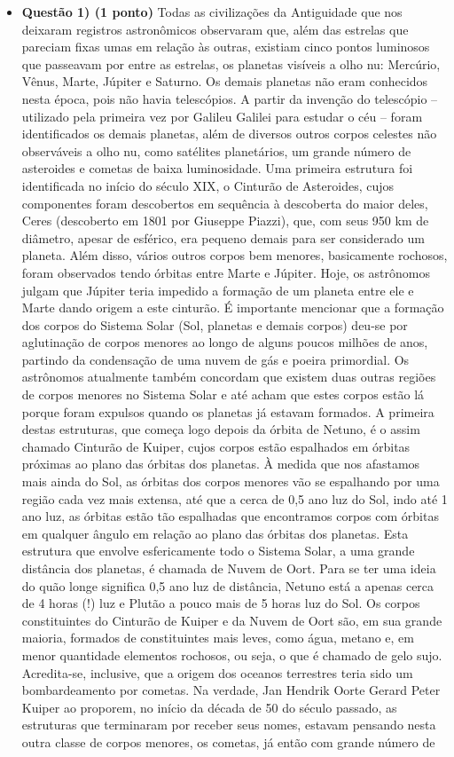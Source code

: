 \documentclass[a4paper, 12pt]{article}
\begin{document}
    \begin{flushleft} \begin{itemize}
        \item \textbf{Questão 1) (1 ponto)} Todas as civilizações da Antiguidade que nos deixaram registros astronômicos observaram que, além das estrelas que pareciam fixas umas em relação às outras, existiam cinco pontos luminosos que passeavam por entre as estrelas, os planetas visíveis a olho nu: Mercúrio, Vênus, Marte, Júpiter e Saturno. Os demais planetas não eram conhecidos nesta época, pois não havia telescópios. A partir da invenção do telescópio – utilizado pela primeira vez por Galileu Galilei para estudar o céu – foram identificados os demais planetas, além de diversos outros corpos celestes não observáveis a olho nu, como satélites planetários, um grande número de asteroides e cometas de baixa luminosidade. Uma primeira estrutura foi identificada no início do século XIX, o Cinturão de Asteroides, cujos componentes foram descobertos em sequência à descoberta do maior deles, Ceres (descoberto em 1801 por Giuseppe Piazzi), que, com seus 950 km de diâmetro, apesar de esférico, era pequeno demais para ser considerado um planeta. Além disso, vários outros corpos bem menores, basicamente rochosos, foram observados tendo órbitas entre Marte e Júpiter. Hoje, os astrônomos julgam que Júpiter teria impedido a formação de um planeta entre ele e Marte dando origem a este cinturão. É importante mencionar que a formação dos corpos do Sistema Solar (Sol, planetas e demais corpos) deu-se por aglutinação de corpos menores ao longo de alguns poucos milhões de anos, partindo da condensação de uma nuvem de gás e poeira primordial. Os astrônomos atualmente também concordam que existem duas outras regiões de corpos menores no Sistema Solar e até acham que estes corpos estão lá porque foram expulsos quando os planetas já estavam formados. A primeira destas estruturas, que começa logo depois da órbita de Netuno, é o assim chamado Cinturão de Kuiper, cujos corpos estão espalhados em órbitas próximas ao plano das órbitas dos planetas. À medida que nos afastamos mais ainda do Sol, as órbitas dos corpos menores vão se espalhando por uma região cada vez mais extensa, até que a cerca de 0,5 ano luz do Sol, indo até 1 ano luz, as órbitas estão tão espalhadas que encontramos corpos com órbitas em qualquer ângulo em relação ao plano das órbitas dos planetas. Esta estrutura que envolve esfericamente todo o Sistema Solar, a uma grande distância dos planetas, é chamada de Nuvem de Oort. Para se ter uma ideia do quão longe significa 0,5 ano luz de distância, Netuno está a apenas cerca de 4 horas (!) luz e Plutão a pouco mais de 5 horas luz do Sol. Os corpos constituintes do Cinturão de Kuiper e da Nuvem de Oort são, em sua grande maioria, formados de constituintes mais leves, como água, metano e, em menor quantidade elementos rochosos, ou seja, o que é chamado de gelo sujo. Acredita-se, inclusive, que a origem dos oceanos terrestres teria sido um bombardeamento por cometas. Na verdade, Jan Hendrik Oorte Gerard Peter Kuiper ao proporem, no início da década de 50 do século passado, as estruturas que terminaram por receber seus nomes, estavam pensando nesta outra classe de corpos menores, os cometas, já então com grande número de 
\end{itemize}
\end{flushleft}
\end{document}
